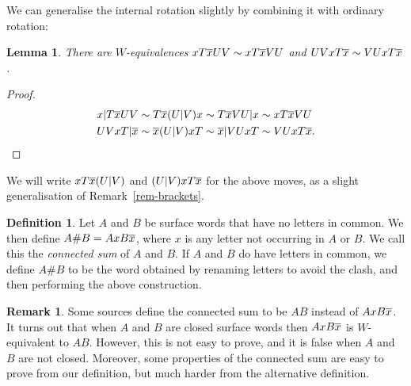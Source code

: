 \documentclass[reqno]{amsart}
\newtheorem{lemma}[theorem]{Lemma}
\theoremstyle{definition}
\newtheorem{remark}[theorem]{Remark}
\newtheorem{definition}[theorem]{Definition}
\begin{document}
We can generalise the internal rotation slightly by combining it with
ordinary rotation:
\begin{lemma}\label{lem-end-rotation}
 There are $W$-equivalences $xT\overline{x} UV\sim xT\overline{x} VU$ and
 $UVxT\overline{x}\sim VU xT\overline{x}$.  
\end{lemma}
\begin{proof}
 \begin{align*}
  x|T\overline{x} UV &\sim T\overline{x}(U|V)x \sim T\overline{x} VU|x \sim xT\overline{x} VU \\
  UVxT|\overline{x}  &\sim \overline{x}(U|V)xT \sim \overline{x}|VUxT\sim VUxT\overline{x}.
 \end{align*}
\end{proof}
We will write $xT\overline{x}(U|V)$ and $(U|V)xT\overline{x}$ for the above moves, as a
slight generalisation of Remark~\ref{rem-brackets}.

\begin{definition}
 Let $A$ and $B$ be surface words that have no letters in common.  We
 then define $A\#B=AxB\overline{x}$, where $x$ is any letter not occurring in
 $A$ or $B$.  We call this the \emph{connected sum} of $A$ and $B$.
 If $A$ and $B$ do have letters in common, we define $A\#B$ to be the
 word obtained by renaming letters to avoid the clash, and then
 performing the above construction.
\end{definition}

\begin{remark}
 Some sources define the connected sum to be $AB$ instead of
 $AxB\overline{x}$.  It turns out that when $A$ and $B$ are closed surface
 words then $AxB\overline{x}$ is $W$-equivalent to $AB$.  However, this is not
 easy to prove, and it is false when $A$ and $B$ are not closed.
 Moreover, some properties of the connected sum are easy to prove from
 our definition, but much harder from the alternative definition.
\end{remark}
\end{document}
